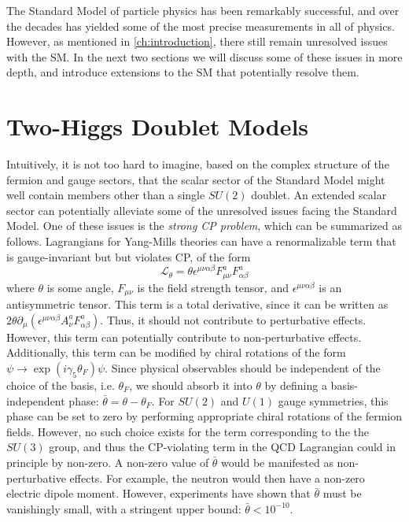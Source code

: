 The Standard Model of particle physics has been remarkably successful, and over the decades has yielded some of the most precise measurements in all of physics. However, as mentioned in \autoref{ch:introduction}, there still remain unresolved issues with the SM. In the next two sections we will discuss some of these issues in more depth, and introduce extensions to the SM that potentially resolve them.

\section{Two-Higgs Doublet Models}\label{sec:2HDMs}

Intuitively, it is not too hard to imagine, based on the complex structure of the fermion and gauge sectors, that the scalar sector of the Standard Model might well contain members other than a single $SU(2)$ doublet. An extended scalar sector can potentially alleviate some of the unresolved issues facing the Standard Model.
One of these issues is the \emph{strong CP problem}, which can be summarized as follows. Lagrangians for Yang-Mills theories can have a renormalizable term that is gauge-invariant but but violates CP, of the form
\[\mathcal{L}_{\theta} = \theta\epsilon^{\mu\nu\alpha\beta}F_{\mu\nu}^aF_{\alpha\beta}^a\]
where $\theta$ is some angle, $F_{\mu\nu}$ is the field strength tensor, and $\epsilon^{\mu\nu\alpha\beta}$ is an antisymmetric tensor. This term is a total derivative, since it can be written as $2\theta\partial_\mu(\epsilon^{\mu\nu\alpha\beta}A_\nu^aF_{\alpha\beta}^a)$. Thus, it should not contribute to perturbative effects. However, this term can potentially contribute to non-perturbative effects. Additionally, this term can be modified by chiral rotations of the form $\psi\rightarrow \exp(i\gamma_5\theta_F)\psi$. Since physical observables should be independent of the choice of the basis, i.e. $\theta_F$, we should absorb it into $\theta$ by defining a basis-independent phase: $\bar{\theta} = \theta-\theta_F$. For $SU(2)$ and $U(1)$ gauge symmetries, this phase can be set to zero by performing appropriate chiral rotations of the fermion fields. However, no such choice exists for the term corresponding to the the $SU(3)$ group, and thus the CP-violating term in the QCD Lagrangian could in principle by non-zero. A non-zero value of $\bar{\theta}$ would be manifested as non-perturbative effects. For example, the neutron would then have a non-zero electric dipole moment. However, experiments have shown that $\bar{\theta}$ must be vanishingly small, with a stringent upper bound: $\bar{\theta}<10^{-10}$.

